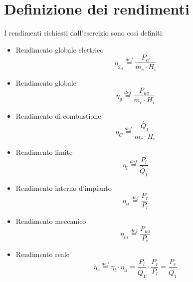 \documentclass[a4paper,12pt]{article}
\begin{document}
\section{Definizione dei rendimenti}
I rendimenti richiesti dall'esercizio sono così definiti:
\begin{itemize}
    \item Rendimento globale elettrico
    \begin{equation}
        \label{eq:rendimento_elettrico}
        \eta_{g_{el}} \stackrel{def}{=} \frac{P_{el}}{\dot m_c \cdot H_i}
    \end{equation}
    
    \item Rendimento globale
    \begin{equation}
        \label{eq:rendimento_globale}
        \eta_g \stackrel{def}{=} \frac{P_{ua}}{\dot{m}_c \cdot H_i}
   \end{equation}

   \item Rendimento di combustione
   \begin{equation}
       \label{eq:rendimento_combustione}
       \eta_C \stackrel{def}{=} \frac{\dot{Q_1}}{\dot{m}_c \cdot H_i}
   \end{equation}

   \item Rendimento limite
   \begin{equation}
       \label{eq:redimento_limite}
       \eta_l \stackrel{def}{=} \frac{P_l}{\dot{Q_1}}
   \end{equation}

   \item Rendimento interno d'impianto
   \begin{equation}
        \label{eq:rendimento_interno}
       \eta_{ii} \stackrel{def}{=} \frac{P_r}{P_l}
   \end{equation}

   \item Rendimento meccanico
   \begin{equation}
       \label{eq:rendimento_meccanico}
       \eta_m \stackrel{def}{=} \frac{P_{ua}}{P_r}
   \end{equation}

   \item Rendimento reale
   \begin{equation}
       \label{eq:rendimento_reale}
       \eta_r \stackrel{def}{=} \eta_l \cdot \eta_{ii} = \frac{P_l}{\dot{Q_1}} \cdot \frac{P_r}{P_l} = \frac{P_r}{\dot{Q_1}}
   \end{equation}


\end{itemize}
\end{document}
